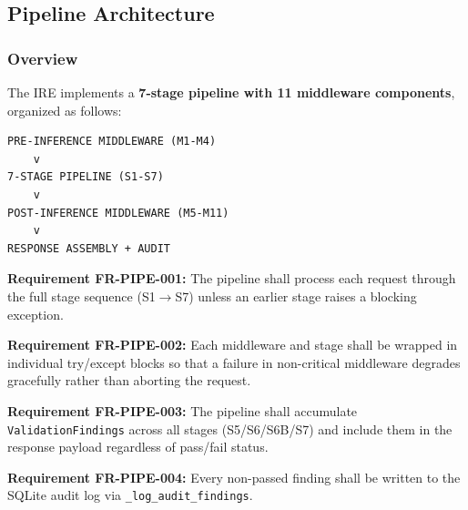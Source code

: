 \documentclass[10pt,journal,onecolumn]{IEEEtran}
\newcommand{\reqid}[1]{\textbf{#1}}
\begin{document}
\subsection{Pipeline Architecture}

\subsubsection{Overview}
The IRE implements a \textbf{7-stage pipeline with 11 middleware components}, organized as follows:
\begin{lstlisting}
PRE-INFERENCE MIDDLEWARE (M1-M4)
    v
7-STAGE PIPELINE (S1-S7)
    v
POST-INFERENCE MIDDLEWARE (M5-M11)
    v
RESPONSE ASSEMBLY + AUDIT
\end{lstlisting}

\reqid{Requirement FR-PIPE-001:} The pipeline shall process each request through the full stage sequence (S1$\rightarrow$S7) unless an earlier stage raises a blocking exception.

\reqid{Requirement FR-PIPE-002:} Each middleware and stage shall be wrapped in individual try/except blocks so that a failure in non-critical middleware degrades gracefully rather than aborting the request.

\reqid{Requirement FR-PIPE-003:} The pipeline shall accumulate \texttt{ValidationFindings} across all stages (S5/S6/S6B/S7) and include them in the response payload regardless of pass/fail status.

\reqid{Requirement FR-PIPE-004:} Every non-passed finding shall be written to the SQLite audit log via \texttt{\_log\_audit\_findings}.
\end{document}
